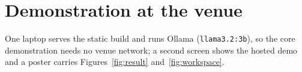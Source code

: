 
\section{Demonstration at the venue}\label{sec:demo}

One laptop serves the static build and runs Ollama (\texttt{llama3.2:3b}), so the core demonstration needs no venue network; a second screen shows the hosted demo and a poster carries Figures~\ref{fig:result} and~\ref{fig:workspace}.

